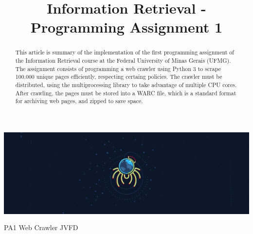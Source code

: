 
\title{Information Retrieval - Programming Assignment 1} %

\begin{abstract}
  This article is summary of the implementation of the first programming assignment of the Information Retrieval course at the Federal University of Minas Gerais (UFMG). The assignment consists of programming a web crawler using Python 3 to scrape 100.000 unique pages efficiently, respecting certaing policies. The crawler must be distributed, using the multiprocessing library to take advantage of multiple CPU cores. After crawling, the pages must be stored into a WARC file, which is a standard format for archiving web pages, and zipped to save space.
\end{abstract}


\begin{teaserfigure}
  \includegraphics[width=\textwidth]{Web_Crawler}
  \caption{PA1 Web Crawler JVFD}
  \label{fig:teaser}
\end{teaserfigure}


\maketitle

